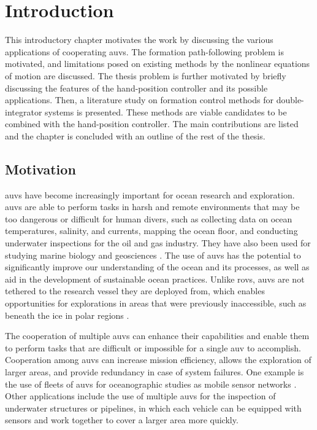 \chapter{Introduction}\label{cha:introduction}
%
This introductory chapter motivates the work by discussing the various applications of cooperating \glspl{auv}. The formation path-following problem is motivated, and limitations posed on existing methods by the nonlinear equations of motion are discussed. The thesis problem is further motivated by briefly discussing the features of the hand-position controller and its possible applications. Then, a literature study on formation control methods for double-integrator systems is presented. These methods are viable candidates to be combined with the hand-position controller. The main contributions are listed and the chapter is concluded with an outline of the rest of the thesis.


\section{Motivation}\label{sec:motivation}
\glspl{auv} have become increasingly important for ocean research and exploration. \glspl{auv} are able to perform tasks in harsh and remote environments that may be too dangerous or difficult for human divers, such as collecting data on ocean temperatures, salinity, and currents, mapping the ocean floor, and conducting underwater inspections for the oil and gas industry. They have also been used for studying marine biology and geosciences \citep{das_data-driven_2015, wynn_autonomous_2014}. The use of \glspl{auv} has the potential to significantly improve our understanding of the ocean and its processes, as well as aid in the development of sustainable ocean practices. Unlike \glspl{rov}, \glspl{auv} are not tethered to the research vessel they are deployed from, which enables opportunities for explorations in areas that were previously inaccessible, such as beneath the ice in polar regions \citep{dowdeswell_autonomous_2008}.

The cooperation of multiple \glspl{auv} can enhance their capabilities and enable them to perform tasks that are difficult or impossible for a single \gls{auv} to accomplish. Cooperation among \glspl{auv} can increase mission efficiency, allows the exploration of larger areas, and provide redundancy in case of system failures. One example is the use of fleets of \glspl{auv} for oceanographic studies as mobile sensor networks \citep{leonard_collective_2007}.  Other applications include the use of multiple \glspl{auv} for the inspection of underwater structures or pipelines, in which each vehicle can be equipped with sensors and work together to cover a larger area more quickly. 

